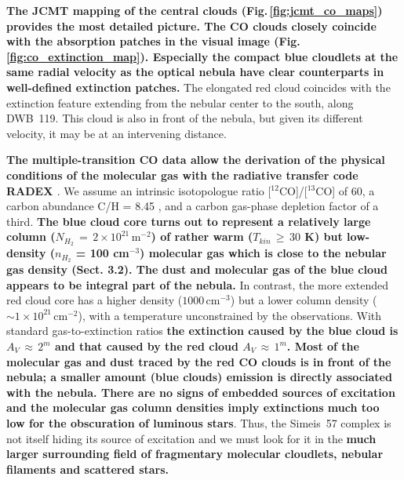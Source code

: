 \documentclass{aa}
\begin{document}
\par \textbf{The JCMT mapping of the central clouds
  (Fig.\,\ref{fig:jcmt_co_maps}) provides the most detailed
  picture. The CO clouds closely coincide with the absorption patches
  in the visual image (Fig.\,\ref{fig:co_extinction_map}). Especially 
  the compact blue cloudlets at the same radial velocity as
  the optical nebula have clear counterparts in well-defined extinction
  patches.} The elongated red cloud coincides with the
  extinction feature extending from the nebular center to the south,
  along DWB~119. This cloud is also in front of the nebula, but given
  its different velocity, it may be at an intervening distance.

  \par \textbf{The multiple-transition CO data allow the derivation of
    the physical conditions of the molecular gas with the radiative
    transfer code RADEX \citep{vanderTak2007}}.  We assume an
  intrinsic isotopologue ratio [$^{12}$CO]/[$^{13}$CO] of 60, a carbon
  abundance C/H = 8.45 \citep[cf. ][]{arellanocrdova2020galactic}, and
  a carbon gas-phase depletion factor of a third. \textbf{The blue
    cloud core turns out to represent a relatively large column
    ($N_{H_2}\,=\,2\times10^{21}\,\mathrm{m^{-2}}$) of rather warm
    ($T_{kin}\,\geq\,30$ K) but low-density ($n_{H_2}$ = 100
    cm$^{-3}$) molecular gas which is close to the nebular gas density
    (Sect. 3.2). The dust and molecular gas of the blue cloud appears
    to be integral part of the nebula.} In contrast, the more extended
  red cloud core has a higher density ($1000\,\mathrm{cm^{-3}}$) but a
  lower column density ($\sim 1\times10^{21}\, \mathrm{cm^{-2}}$),
  with a temperature unconstrained by the observations. With standard
  gas-to-extinction ratios \citep{zhu2017_gastoextinction} \textbf{the
      extinction caused by the blue cloud is $A_{V}\,\approx\,2^{m}$
      and that caused by the red cloud $A_{V}\,\approx\,1^{m}$.  Most
      of the molecular gas and dust traced by the red CO clouds is in
      front of the nebula; a smaller amount (blue clouds) emission is
      directly associated with the nebula. There are no signs of
      embedded sources of excitation and the molecular gas column
      densities imply extinctions much too low for the obscuration of
      luminous stars}. Thus, the Simeis~57 complex is not itself
    hiding its source of excitation and we must look for it in the
    \textbf{much larger surrounding field of fragmentary molecular
      cloudlets, nebular filaments and scattered stars.}
\end{document}
